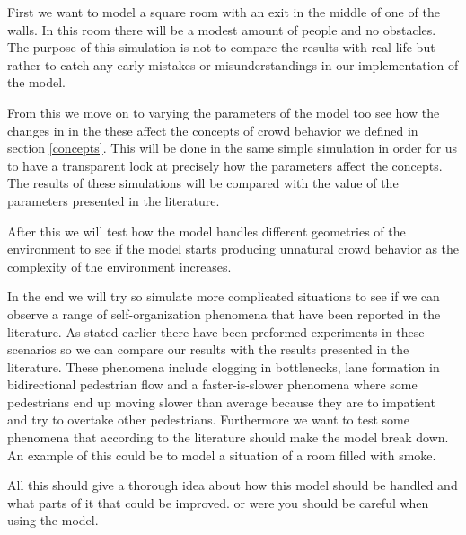 First we want to model a square room with an exit in the middle of one of the walls. 
In this room there will be a modest amount of people and no obstacles. The purpose of 
this simulation is not to compare the results with real life but rather to catch any 
early mistakes or misunderstandings in our implementation of the model.

From this we move on to varying the parameters of the model too see how the changes in 
in the these affect the concepts of crowd behavior we defined in section \ref{concepts}. 
This will be done in the same simple simulation in order for us to have a transparent look 
at precisely how the parameters affect the concepts. The results of these simulations 
will be compared with the value of the parameters presented in the literature.

After this we will test how the model handles different geometries of the environment 
to see if the model starts producing unnatural crowd behavior as the complexity of the 
environment increases. 

In the end we will try so simulate more complicated situations to see if we can observe 
a range of self-organization phenomena that have been reported in the literature. As 
stated earlier there have been preformed experiments in these scenarios so we can 
compare our results with the results presented in the literature. These phenomena 
include clogging in bottlenecks, lane formation in bidirectional pedestrian 
flow and a faster-is-slower phenomena where some pedestrians end up moving slower than 
average because they are to impatient and try to overtake other pedestrians\cite{self-org}. 
Furthermore we want to test some phenomena  that according to the literature should make 
the model break down. An example of this could be to model a situation of a room filled 
with smoke.   

All this should give a thorough idea about how this model should be handled and what parts 
of it that could be improved. or were you should be careful when using the model.

